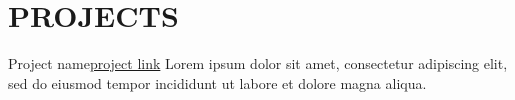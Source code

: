 \documentclass[10pt, a4paper]{article}
\begin{document}

\section{PROJECTS}


\begin{projitem}{Project name}{\href{https://link}{project link}}
    Lorem ipsum dolor sit amet, consectetur adipiscing elit, sed do eiusmod tempor incididunt ut labore et dolore magna aliqua.
\end{projitem}


\fincols
\end{document}
